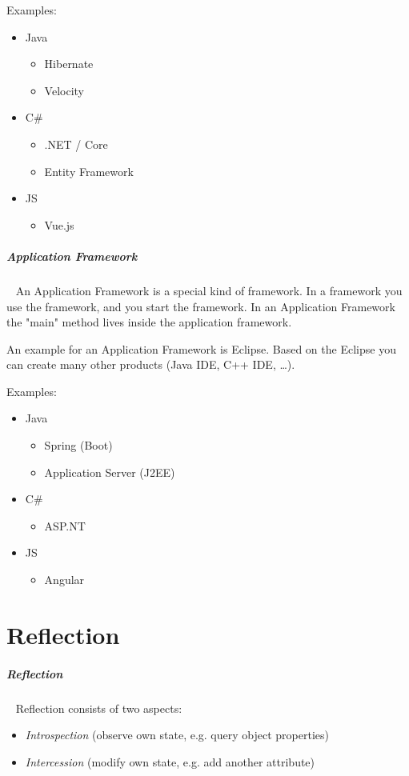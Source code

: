 \documentclass[11pt,twoside,landscape]{article}
\begin{document}
\begin{multicols}{3}
Examples:
\begin{itemize}
\item Java
\begin{itemize}
\item Hibernate
\item Velocity
\end{itemize}
\item C\#
\begin{itemize}
\item .NET / Core
\item Entity Framework
\end{itemize}
\item JS
\begin{itemize}
\item Vue.js
\end{itemize}
\end{itemize}
\subparagraph{Application Framework} \
\label{sec:orgdbcbc04}
An Application Framework is a special kind of framework.
In a framework you use the framework, and you start the framework.
In an Application Framework the "main" method lives inside the application framework.

An example for an Application Framework is Eclipse.
Based on the Eclipse you can create many other products (Java IDE, C++ IDE, \ldots{}).

Examples:
\begin{itemize}
\item Java
\begin{itemize}
\item Spring (Boot)
\item Application Server (J2EE)
\end{itemize}
\item C\#
\begin{itemize}
\item ASP.NT
\end{itemize}
\item JS
\begin{itemize}
\item Angular
\end{itemize}
\end{itemize}
\section{Reflection}
\label{sec:org16d2c81}
\subparagraph{Reflection} \
\label{sec:orgf8832c8}
Reflection consists of two aspects:
\begin{itemize}
\item \emph{Introspection} (observe own state, e.g. query object properties)
\item \emph{Intercession} (modify own state, e.g. add another attribute)
\end{itemize}


\end{multicols}
\end{document}
